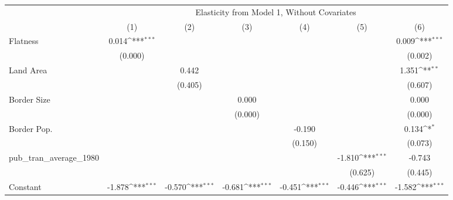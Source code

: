 {
\def\sym#1{\ifmmode^{#1}\else\(^{#1}\)\fi}
\begin{tabular}{l*{6}{c}}
\hline\hline
            &\multicolumn{6}{c}{Elasticity from Model 1, Without Covariates}                                                                    \\
            &\multicolumn{1}{c}{(1)}         &\multicolumn{1}{c}{(2)}         &\multicolumn{1}{c}{(3)}         &\multicolumn{1}{c}{(4)}         &\multicolumn{1}{c}{(5)}         &\multicolumn{1}{c}{(6)}         \\
\hline
Flatness    &       0.014\sym{***}&                     &                     &                     &                     &       0.009\sym{***}\\
            &     (0.000)         &                     &                     &                     &                     &     (0.002)         \\
[1em]
Land Area   &                     &       0.442         &                     &                     &                     &       1.351\sym{**} \\
            &                     &     (0.405)         &                     &                     &                     &     (0.607)         \\
[1em]
Border Size &                     &                     &       0.000         &                     &                     &       0.000         \\
            &                     &                     &     (0.000)         &                     &                     &     (0.000)         \\
[1em]
Border Pop. &                     &                     &                     &      -0.190         &                     &       0.134\sym{*}  \\
            &                     &                     &                     &     (0.150)         &                     &     (0.073)         \\
[1em]
pub\_tran\_average\_1980&                     &                     &                     &                     &      -1.810\sym{***}&      -0.743         \\
            &                     &                     &                     &                     &     (0.625)         &     (0.445)         \\
[1em]
Constant    &      -1.878\sym{***}&      -0.570\sym{***}&      -0.681\sym{***}&      -0.451\sym{***}&      -0.446\sym{***}&      -1.582\sym{***}\\

\end{tabular}}
